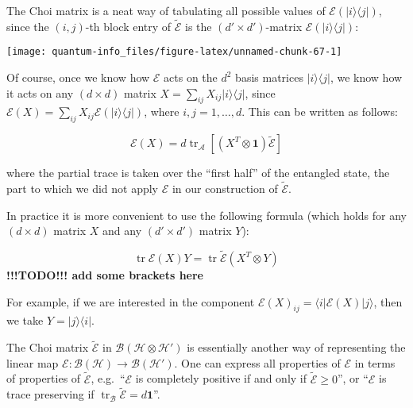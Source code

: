 \documentclass[fleqn]{article}
\newenvironment{idea}{\noindent}{\medskip}
\begin{document}
The Choi matrix is a neat way of tabulating all possible values of \(\mathcal{E}(|i\rangle\langle j|)\), since the \((i,j)\)-th block entry of \(\widetilde{\mathcal{E}}\) is the \((d'\times d')\)-matrix \(\mathcal{E}(|i\rangle\langle j|)\):

\begin{center}\texttt{[image: quantum-info\_files/figure-latex/unnamed-chunk-67-1]} \end{center}

Of course, once we know how \(\mathcal{E}\) acts on the \(d^2\) basis matrices \(|i\rangle\langle j|\), we know how it acts on any \((d\times d)\) matrix \(X=\sum_{ij}X_{ij}|i\rangle\langle j|\), since \(\mathcal{E}(X) = \sum_{ij}X_{ij}\mathcal{E}(|i\rangle\langle j|)\), where \(i,j=1,\ldots, d\).
This can be written as follows:

\begin{idea}

\[
  \mathcal{E}(X) =  d \operatorname{tr}_{\mathcal{A}} [(X^T\otimes\mathbf{1})\widetilde{\mathcal{E}}]
\]

\end{idea}

where the partial trace is taken over the ``first half'' of the entangled state, the part to which we did not apply \(\mathcal{E}\) in our construction of \(\widetilde{\mathcal{E}}\).

In practice it is more convenient to use the following formula (which holds for any \((d\times d)\) matrix \(X\) and any \((d'\times d')\) matrix \(Y\)):

\begin{idea}

\[
 \operatorname{tr}\mathcal{E}(X)Y
 = \operatorname{tr}\widetilde{\mathcal{E}}(X^T\otimes Y)
\]
\textbf{!!!TODO!!! add some brackets here}

\end{idea}

For example, if we are interested in the component \(\mathcal{E}(X)_{ij}= \langle i|\mathcal{E}(X)|j\rangle\), then we take \(Y=|j\rangle\langle i|\).

The Choi matrix \(\widetilde{\mathcal{E}}\) in \(\mathscr{B}(\mathcal{H}\otimes\mathcal{H'})\) is essentially another way of representing the linear map \(\mathcal{E}\colon\mathscr{B}(\mathcal{H})\to\mathscr{B}(\mathcal{H'})\).
One can express all properties of \(\mathcal{E}\) in terms of properties of \(\widetilde{\mathcal{E}}\), e.g.~``\(\mathcal{E}\) is completely positive if and only if \(\widetilde{\mathcal{E}}\geqslant 0\)'', or ``\(\mathcal{E}\) is trace preserving if \(\operatorname{tr}_{\mathcal{B}}\widetilde{\mathcal{E}}=d\mathbf{1}\)''.
\end{document}
